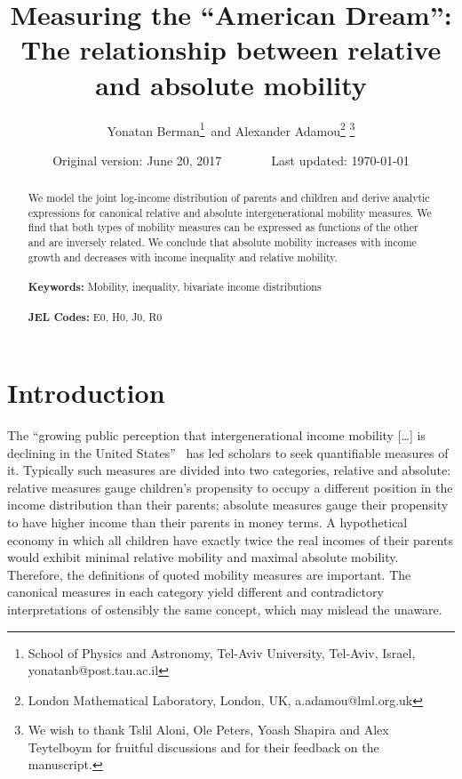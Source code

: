 \documentclass[12pt,times,letter]{article}
\numberwithin{equation}{section}
\begin{document}
\doublespacing

\begin{titlepage}
\title{Measuring the ``American Dream'': The relationship between relative and absolute mobility}
\author{Yonatan Berman\footnote{School of Physics and Astronomy, Tel-Aviv University, Tel-Aviv, Israel, yonatanb@post.tau.ac.il}\, and Alexander Adamou\footnote{London Mathematical Laboratory, London, UK, a.adamou@lml.org.uk} \thanks{We wish to thank Tslil Aloni, Ole Peters, Yoash Shapira and Alex Teytelboym for fruitful discussions and for their feedback on the manuscript.}}
\date{Original version: June 20, 2017\,\,\,\,\,\,\,\,\,\,\,\,\,\,\,\,\,\,\,\,\,\,\,\,Last updated: \today}
\maketitle
\begin{abstract}
\noindent We model the joint log-income distribution of parents and children and derive analytic expressions for canonical relative and absolute intergenerational mobility measures. We find that both types of mobility measures can be expressed as functions of the other and are inversely related. We conclude that absolute mobility increases with income growth and decreases with income inequality and relative mobility.\\
\vspace{0in}\\
\noindent\textbf{Keywords:} Mobility, inequality, bivariate income distributions\\
\vspace{0in}\\
\noindent\textbf{JEL Codes:} E0, H0, J0, R0\\

\bigskip
\end{abstract}
\setcounter{page}{0}
\thispagestyle{empty}
\end{titlepage}
\pagebreak \newpage

\doublespacing

\section{Introduction} \label{sec:introduction}

The ``growing public perception that intergenerational income mobility [\ldots] is declining in the United States''~\citep[p.~141]{chetty2014united} has led scholars to seek quantifiable measures of it. Typically such measures are divided into two categories, relative and absolute: relative measures gauge children's propensity to occupy a different position in the income distribution than their parents; absolute measures gauge their propensity to have higher income than their parents in money terms. A hypothetical economy in which all children have exactly twice the real incomes of their parents would exhibit minimal relative mobility and maximal absolute mobility. Therefore, the definitions of quoted mobility measures are important. The canonical measures in each category yield different and contradictory interpretations of ostensibly the same concept, which may mislead the unaware.
\end{document}
